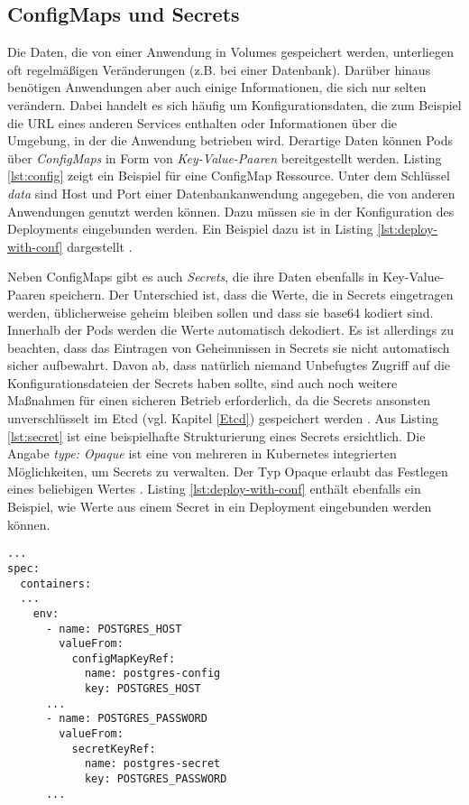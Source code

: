 \documentclass[11pt,a4paper]{article}
\begin{document}
\subsection{ConfigMaps und Secrets}
Die Daten, die von einer Anwendung in Volumes gespeichert werden, unterliegen oft regelmäßigen Veränderungen
(z.B. bei einer Datenbank). Darüber hinaus benötigen Anwendungen aber auch einige Informationen, die sich nur
selten verändern. Dabei handelt es sich häufig um Konfigurationsdaten, die zum Beispiel die URL eines anderen
Services enthalten oder Informationen über die Umgebung, in der die Anwendung betrieben wird.
Derartige Daten können Pods über \emph{ConfigMaps} in Form von \emph{Key-Value-Paaren} bereitgestellt werden.
Listing \ref{lst:config} zeigt ein Beispiel für eine ConfigMap Ressource.
Unter dem Schlüssel \emph{data} sind Host und Port einer Datenbankanwendung angegeben,
die von anderen Anwendungen genutzt werden können. Dazu müssen sie in der Konfiguration des
Deployments eingebunden werden. Ein Beispiel dazu ist in Listing \ref{lst:deploy-with-conf} dargestellt \cite{Schmeling_Dargatz_2022}.




Neben ConfigMaps gibt es auch \emph{Secrets}, die ihre Daten ebenfalls in Key-Value-Paaren speichern.
Der Unterschied ist, dass die Werte, die in Secrets eingetragen werden, üblicherweise geheim bleiben sollen und
dass sie base64 \cite{rfc4648} kodiert sind. Innerhalb der Pods werden die Werte automatisch dekodiert.
Es ist allerdings zu beachten, dass das Eintragen von Geheimnissen in Secrets sie nicht automatisch sicher
aufbewahrt. Davon ab, dass natürlich niemand Unbefugtes Zugriff auf die Konfigurationsdateien der Secrets haben sollte,
sind auch noch weitere Maßnahmen für einen sicheren Betrieb erforderlich, da die Secrets ansonsten
unverschlüsselt im Etcd (vgl. Kapitel \ref{Etcd}) gespeichert werden \cite{Schmeling_Dargatz_2022}.
Aus Listing \ref{lst:secret} ist eine beispielhafte Strukturierung eines Secrets ersichtlich.
Die Angabe \emph{type: Opaque} ist eine von mehreren in Kubernetes integrierten Möglichkeiten,
um Secrets zu verwalten. Der Typ Opaque erlaubt das Festlegen eines beliebigen Wertes \cite{kubernetes.secret_types}.
Listing \ref{lst:deploy-with-conf} enthält ebenfalls ein Beispiel, wie Werte aus einem
Secret in ein Deployment eingebunden werden können.


\begin{lstlisting}[caption={Referenzen zur ConfigMaps und Secrets können in einem Deployment unter dem Schlüssel \emph{env} definiert werden.}, label={lst:deploy-with-conf}]
...
spec:
  containers:
  ...
    env:
      - name: POSTGRES_HOST
        valueFrom:
          configMapKeyRef:
            name: postgres-config
            key: POSTGRES_HOST
      ...
      - name: POSTGRES_PASSWORD
        valueFrom:
          secretKeyRef:
            name: postgres-secret
            key: POSTGRES_PASSWORD
      ...
\end{lstlisting}
\end{document}
